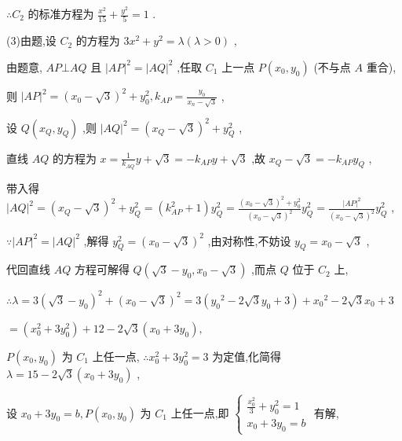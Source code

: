 \documentclass[10pt]{article}
\begin{document}
\(\therefore {C}_{2}\) 的标准方程为 \(\frac{{x}^{2}}{15} + \frac{{y}^{2}}{5} = 1\) .

(3)由题,设 \({C}_{2}\) 的方程为 \(3{x}^{2} + {y}^{2} = \lambda \left( {\lambda  > 0}\right)\) ,

由题意, \({AP} \bot  {AQ}\) 且 \({\left| AP\right| }^{2} = {\left| AQ\right| }^{2}\) ,任取 \({C}_{1}\) 上一点 \(P\left( {{x}_{0},{y}_{0}}\right)\) (不与点 \(A\) 重合),

则 \({\left| AP\right| }^{2} = {\left( {x}_{0} - \sqrt{3}\right) }^{2} + {y}_{0}^{2},{k}_{AP} = \frac{{y}_{0}}{{x}_{n} - \sqrt{3}}\) ,

设 \(Q\left( {{x}_{Q},{y}_{Q}}\right)\) ,则 \({\left| AQ\right| }^{2} = {\left( {x}_{Q} - \sqrt{3}\right) }^{2} + {y}_{Q}^{2}\) ,

直线 \({AQ}\) 的方程为 \(x = \frac{1}{{k}_{AQ}}y + \sqrt{3} =  - {k}_{AP}y + \sqrt{3}\) ,故 \({x}_{Q} - \sqrt{3} =  - {k}_{AP}{y}_{Q}\) ,

带入得 \({\left| AQ\right| }^{2} = {\left( {x}_{Q} - \sqrt{3}\right) }^{2} + {y}_{Q}^{2} = \left( {{k}_{AP}^{2} + 1}\right) {y}_{Q}^{2} = \frac{{\left( {x}_{0} - \sqrt{3}\right) }^{2} + {y}_{0}^{2}}{{\left( {x}_{0} - \sqrt{3}\right) }^{2}}{y}_{Q}^{2} = \frac{{\left| AP\right| }^{2}}{{\left( {x}_{0} - \sqrt{3}\right) }^{2}}{y}_{Q}^{2}\) ,

\(\because {\left| AP\right| }^{2} = {\left| AQ\right| }^{2}\) ,解得 \({y}_{Q}^{2} = {\left( {x}_{0} - \sqrt{3}\right) }^{2}\) ,由对称性,不妨设 \({y}_{Q} = {x}_{0} - \sqrt{3}\) ,

代回直线 \({AQ}\) 方程可解得 \(Q\left( {\sqrt{3} - {y}_{0},{x}_{0} - \sqrt{3}}\right)\) ,而点 \(Q\) 位于 \({C}_{2}\) 上,

\(\therefore \lambda  = 3{\left( \sqrt{3} - {y}_{0}\right) }^{2} + {\left( {x}_{0} - \sqrt{3}\right) }^{2} = 3\left( {{y}_{0}{}^{2} - 2\sqrt{3}{y}_{0} + 3}\right)  + {x}_{0}{}^{2} - 2\sqrt{3}{x}_{0} + 3\)

\(= \left( {{x}_{0}^{2} + 3{y}_{0}^{2}}\right)  + {12} - 2\sqrt{3}\left( {{x}_{0} + 3{y}_{0}}\right) ,\)

\(P\left( {{x}_{0},{y}_{0}}\right)\) 为 \({C}_{1}\) 上任一点, \(\therefore {x}_{0}^{2} + 3{y}_{0}^{2} = 3\) 为定值,化简得 \(\lambda  = {15} - 2\sqrt{3}\left( {{x}_{0} + 3{y}_{0}}\right)\) ,

设 \({x}_{0} + 3{y}_{0} = b,P\left( {{x}_{0},{y}_{0}}\right)\) 为 \({C}_{1}\) 上任一点,即 \(\left\{  \begin{array}{l} \frac{{x}_{0}^{2}}{3} + {y}_{0}^{2} = 1 \\  {x}_{0} + 3{y}_{0} = b \end{array}\right.\) 有解,
\end{document}
